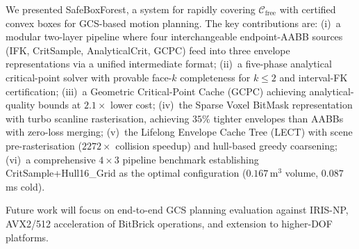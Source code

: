 \documentclass[journal]{IEEEtran}
\newcommand{\Cfree}{\mathcal{C}_\text{free}}
\begin{document}
We presented SafeBoxForest, a system for rapidly covering
$\Cfree$ with certified convex boxes for GCS-based motion planning.
The key contributions are:
(i)~a modular two-layer pipeline where four interchangeable
endpoint-AABB sources (IFK, CritSample, AnalyticalCrit, GCPC)
feed into three envelope representations via a unified
intermediate format;
(ii)~a five-phase analytical critical-point solver with provable
face-$k$ completeness for $k \leq 2$ and interval-FK certification;
(iii)~a Geometric Critical-Point Cache (GCPC) achieving
analytical-quality bounds at $2.1{\times}$ lower cost;
(iv)~the Sparse Voxel BitMask representation with turbo scanline
rasterisation, achieving $35\%$ tighter envelopes than AABBs
with zero-loss merging;
(v)~the Lifelong Envelope Cache Tree (LECT) with
scene pre-rasterisation ($2272{\times}$ collision speedup)
and hull-based greedy coarsening;
(vi)~a comprehensive $4{\times}3$ pipeline benchmark
establishing CritSample+Hull16\_Grid as the optimal configuration
($0.167$\,m$^3$ volume, $0.087$\,ms cold).

Future work will focus on end-to-end GCS planning evaluation
against IRIS-NP, AVX2/512 acceleration of BitBrick operations,
and extension to higher-DOF platforms.



\end{document}

